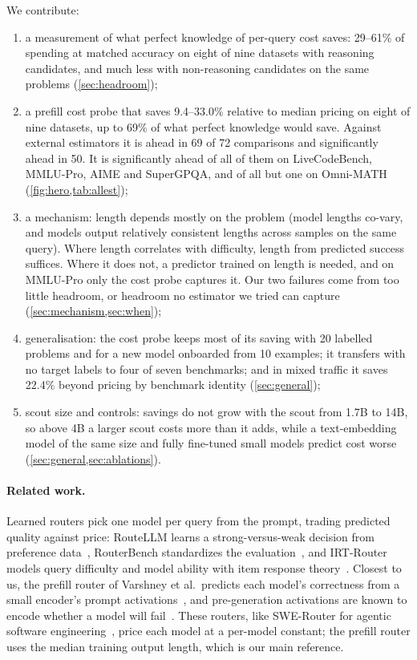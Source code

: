 \documentclass[10pt]{article}
\begin{document}
We contribute:
\begin{enumerate}
\item a measurement of what perfect knowledge of per-query cost saves: 29--61\% of spending at matched accuracy on eight of nine datasets with reasoning candidates, and much less with non-reasoning candidates on the same problems (\cref{sec:headroom});
\item a prefill cost probe that saves 9.4--33.0\% relative to median pricing on eight of nine datasets, up to 69\% of what perfect knowledge would save. Against external estimators it is ahead in 69 of 72 comparisons and significantly ahead in 50. It is significantly ahead of all of them on LiveCodeBench, MMLU-Pro, AIME and SuperGPQA, and of all but one on Omni-MATH (\cref{fig:hero,tab:allest});
\item a mechanism: length depends mostly on the problem (model lengths co-vary, and models output relatively consistent lengths across samples on the same query). Where length correlates with difficulty, length from predicted success suffices. Where it does not, a predictor trained on length is needed, and on MMLU-Pro only the cost probe captures it. Our two failures come from too little headroom, or headroom no estimator we tried can capture (\cref{sec:mechanism,sec:when});
\item generalisation: the cost probe keeps most of its saving with 20 labelled problems and for a new model onboarded from 10 examples; it transfers with no target labels to four of seven benchmarks; and in mixed traffic it saves 22.4\% beyond pricing by benchmark identity (\cref{sec:general});
\item scout size and controls: savings do not grow with the scout from 1.7B to 14B, so above 4B a larger scout costs more than it adds, while a text-embedding model of the same size and fully fine-tuned small models predict cost worse (\cref{sec:general,sec:ablations}).
\end{enumerate}

\paragraph{Related work.}
Learned routers pick one model per query from the prompt, trading predicted quality against price: RouteLLM learns a strong-versus-weak decision from preference data~\citep{routellm}, RouterBench standardizes the evaluation~\citep{routerbench}, and IRT-Router models query difficulty and model ability with item response theory~\citep{irtrouter}. Closest to us, the prefill router of Varshney et al.\ predicts each model's correctness from a small encoder's prompt activations~\citep{prefill}, and pre-generation activations are known to encode whether a model will fail~\citep{encodefailures}. These routers, like SWE-Router for agentic software engineering~\citep{swerouter}, price each model at a per-model constant; the prefill router uses the median training output length, which is our main reference.
\end{document}
